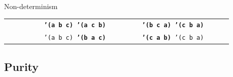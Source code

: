 \documentclass{beamer}
\begin{document}
\begin{frame}{Non-determinism}
  \tiny
  \begin{tabularx}{\textwidth}{ X X }
    \texttt{\ \newline
      \ \newline
      \ \newline
      \ \newline
      \ \newline
      \hphantom{\_\_\_\_\_\_}\textbf{'(a b c)\newline
      \hphantom{\_\_\_\_\_\_}'(a c b)}\newline
      \ 
    }
    &
    \texttt{\ \newline
      \ \newline
      \ \newline
      \hphantom{\_\_\_\_\_\_}\textbf{'(b c a)\newline
      \hphantom{\_\_\_\_\_\_}'(c b a)}\newline
      \ \newline
      \ \newline
      \ 
    }

    \\

    \texttt{\ \newline
      \ \newline
      \ \newline
      \ \newline
      \ \newline
      \hphantom{\_\_\_\_\_\_}'(a b c)\newline
      \hphantom{\_\_\_\_\_\_}\textbf{'(b a c)}\newline
      \ 
    }
    &
    \texttt{\ \newline
      \ \newline
      \ \newline
      \hphantom{\_\_\_\_\_\_}\textbf{'(c a b)}\newline
      \hphantom{\_\_\_\_\_\_}'(c b a)\newline
      \ \newline
      \ \newline
      \ 
    }

  \end{tabularx}
\end{frame}

\subsection{Purity}
\end{document}
